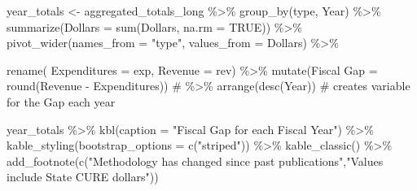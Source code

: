 \documentclass[
  letterpaper,
  DIV=11,
  numbers=noendperiod]{scrreport}
\newenvironment{Shaded}{\begin{snugshade}}{\end{snugshade}}
\newcommand{\AttributeTok}[1]{\textcolor[rgb]{0.40,0.45,0.13}{#1}}
\newcommand{\CommentTok}[1]{\textcolor[rgb]{0.37,0.37,0.37}{#1}}
\newcommand{\ConstantTok}[1]{\textcolor[rgb]{0.56,0.35,0.01}{#1}}
\newcommand{\FunctionTok}[1]{\textcolor[rgb]{0.28,0.35,0.67}{#1}}
\newcommand{\NormalTok}[1]{\textcolor[rgb]{0.00,0.23,0.31}{#1}}
\newcommand{\OtherTok}[1]{\textcolor[rgb]{0.00,0.23,0.31}{#1}}
\newcommand{\SpecialCharTok}[1]{\textcolor[rgb]{0.37,0.37,0.37}{#1}}
\newcommand{\StringTok}[1]{\textcolor[rgb]{0.13,0.47,0.30}{#1}}
\begin{document}
\begin{Shaded}
\begin{Highlighting}[]
\NormalTok{year\_totals }\OtherTok{\textless{}{-}}\NormalTok{ aggregated\_totals\_long }\SpecialCharTok{\%\textgreater{}\%} 
  \FunctionTok{group\_by}\NormalTok{(type, Year) }\SpecialCharTok{\%\textgreater{}\%} 
  \FunctionTok{summarize}\NormalTok{(}\AttributeTok{Dollars =} \FunctionTok{sum}\NormalTok{(Dollars, }\AttributeTok{na.rm =} \ConstantTok{TRUE}\NormalTok{)) }\SpecialCharTok{\%\textgreater{}\%} 
  \FunctionTok{pivot\_wider}\NormalTok{(}\AttributeTok{names\_from =} \StringTok{"type"}\NormalTok{, }\AttributeTok{values\_from =}\NormalTok{ Dollars) }\SpecialCharTok{\%\textgreater{}\%} 

  \FunctionTok{rename}\NormalTok{(}
         \AttributeTok{Expenditures =}\NormalTok{ exp,}
         \AttributeTok{Revenue =}\NormalTok{ rev) }\SpecialCharTok{\%\textgreater{}\%}  
  \FunctionTok{mutate}\NormalTok{(}\StringTok{\textasciigrave{}}\AttributeTok{Fiscal Gap}\StringTok{\textasciigrave{}} \OtherTok{=} \FunctionTok{round}\NormalTok{(Revenue }\SpecialCharTok{{-}}\NormalTok{ Expenditures))}
\CommentTok{\# \%\textgreater{}\%  arrange(desc(Year))}
\CommentTok{\# creates variable for the Gap each year}

\NormalTok{year\_totals  }\SpecialCharTok{\%\textgreater{}\%}  
  \FunctionTok{kbl}\NormalTok{(}\AttributeTok{caption =} \StringTok{"Fiscal Gap for each Fiscal Year"}\NormalTok{) }\SpecialCharTok{\%\textgreater{}\%} 
  \FunctionTok{kable\_styling}\NormalTok{(}\AttributeTok{bootstrap\_options =} \FunctionTok{c}\NormalTok{(}\StringTok{"striped"}\NormalTok{))  }\SpecialCharTok{\%\textgreater{}\%}
\FunctionTok{kable\_classic}\NormalTok{() }\SpecialCharTok{\%\textgreater{}\%}   \FunctionTok{add\_footnote}\NormalTok{(}\FunctionTok{c}\NormalTok{(}\StringTok{"Methodology has changed since past publications"}\NormalTok{,}\StringTok{"Values include State CURE dollars"}\NormalTok{))}
\end{Highlighting}
\end{Shaded}
\end{document}

